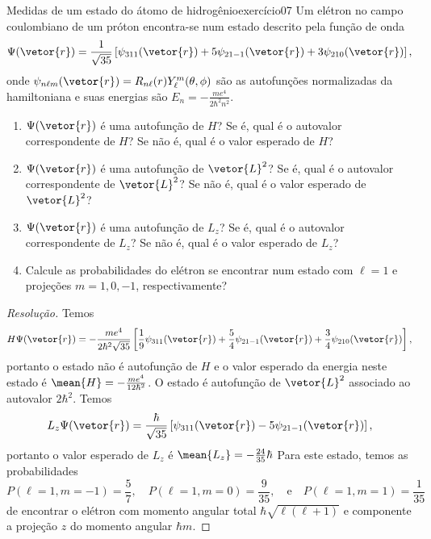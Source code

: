 \begin{exercício}{Medidas de um estado do átomo de hidrogênio}{exercício07}
    Um elétron no campo coulombiano de um próton encontra-se num estado descrito pela função de onda
    \begin{equation*}
        \Psi(\vetor{r}) = \frac1{\sqrt{35}}\left[\psi_{311}(\vetor{r}) + 5 \psi_{21-1}(\vetor{r}) + 3\psi_{210}(\vetor{r})\right],
    \end{equation*}
    onde \(\psi_{n\ell m}(\vetor{r}) = R_{n\ell}(r) Y_{\ell}^m(\theta, \phi)\) são as autofunções normalizadas da hamiltoniana e suas energias são \(E_n = - \frac{m e^4}{2\hbar^2 n^2}\).
    \begin{enumerate}[label=(\alph*)]
        \item \(\Psi(\vetor{r})\) é uma autofunção de \(H\)? Se é, qual é o autovalor correspondente de \(H\)? Se não é, qual é o valor esperado de \(H\)?
        \item \(\Psi(\vetor{r})\) é uma autofunção de \(\vetor{L}^2\)? Se é, qual é o autovalor correspondente de \(\vetor{L}^2\)? Se não é, qual é o valor esperado de \(\vetor{L}^2\)?
        \item \(\Psi(\vetor{r})\) é uma autofunção de \(L_z\)? Se é, qual é o autovalor correspondente de \(L_z\)? Se não é, qual é o valor esperado de \(L_z\)?
        \item Calcule as probabilidades do elétron se encontrar num estado com \(\ell = 1\) e projeções \(m = 1, 0, -1\), respectivamente?
    \end{enumerate}
\end{exercício}
\begin{proof}[Resolução]
    Temos
    \begin{equation*}
        H\Psi(\vetor{r}) = -\frac{me^4}{2\hbar^2\sqrt{35}}\left[\frac{1}{9}\psi_{311}(\vetor{r}) + \frac{5}{4}\psi_{21-1}(\vetor{r}) + \frac{3}{4} \psi_{210}(\vetor{r})\right],
    \end{equation*}
    portanto o estado não é autofunção de \(H\) e o valor esperado da energia neste estado é \(\mean{H} = -\frac{m e^4}{12\hbar^2}\). O estado é autofunção de \(\vetor{L}^2\) associado ao autovalor \(2\hbar^2\). Temos
    \begin{equation*}
        L_z \Psi(\vetor{r}) = \frac{\hbar}{\sqrt{35}}\left[\psi_{311}(\vetor{r}) - 5\psi_{21-1}(\vetor{r})\right],
    \end{equation*}
    portanto o valor esperado de \(L_z\) é \(\mean{L_z} = -\frac{24}{35}\hbar \)
    Para este estado, temos as probabilidades
    \begin{equation*}
        P(\ell = 1, m = -1) = \frac{5}{7},\quad
        P(\ell = 1, m = 0) = \frac{9}{35},\quad\text{e}\quad
        P(\ell = 1, m = 1) = \frac{1}{35}
    \end{equation*}
    de encontrar o elétron com momento angular total \(\hbar \sqrt{\ell(\ell + 1)}\) e componente a projeção \(z\) do momento angular \(\hbar m\).
\end{proof}
